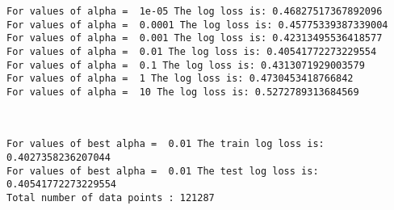 \documentclass[11pt]{article}
\begin{document}
    \begin{Verbatim}[commandchars=\\\{\}]
For values of alpha =  1e-05 The log loss is: 0.46827517367892096
For values of alpha =  0.0001 The log loss is: 0.45775339387339004
For values of alpha =  0.001 The log loss is: 0.42313495536418577
For values of alpha =  0.01 The log loss is: 0.40541772273229554
For values of alpha =  0.1 The log loss is: 0.4313071929003579
For values of alpha =  1 The log loss is: 0.4730453418766842
For values of alpha =  10 The log loss is: 0.5272789313684569

    \end{Verbatim}

    \begin{center}
    \end{center}
    { \hspace*{\fill} \\}
    
    \begin{Verbatim}[commandchars=\\\{\}]
For values of best alpha =  0.01 The train log loss is: 0.4027358236207044
For values of best alpha =  0.01 The test log loss is: 0.40541772273229554
Total number of data points : 121287

    \end{Verbatim}

    \begin{center}
    \end{center}
    { \hspace*{\fill} \\}
    
\end{document}
